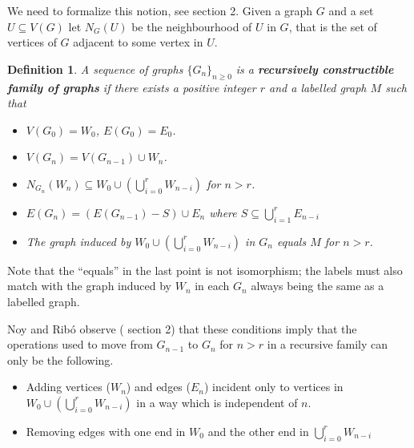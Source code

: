 \documentclass[12pt]{amsart}
\newtheorem{definition}{Definition}
\numberwithin{definition}{section}
\begin{document}
We need to formalize this notion, see \cite{NoyRibo2004} section 2.  Given a graph $G$ and a set $U\subseteq V(G)$ let $N_G(U)$ be the neighbourhood of $U$ in $G$, that is the set of vertices of $G$ adjacent to some vertex in $U$.
\begin{definition}
  A sequence of graphs $\{G_n\}_{n\geq0}$ is a \textbf{recursively constructible family of graphs} if there exists a positive integer $r$ and a labelled graph $M$ such that
  \begin{itemize}
  \item $V(G_0) = W_0$, $E(G_0)=E_0$.
  \item $V(G_n) = V(G_{n-1})\cup W_n$.
  \item $N_{G_n}(W_n)\subseteq W_0 \cup \left(\bigcup_{i=0}^{r}W_{n-i}\right)$ for $n> r$.
  \item $E(G_n) = (E(G_{n-1})- S) \cup E_n$ where $S \subseteq \bigcup_{i=1}^rE_{n-i}$
  \item The graph induced by $W_0\cup\left(\bigcup_{i=0}^{r}W_{n-i}\right)$ in $G_n$ equals $M$ for $n>r$.
  \end{itemize}
\end{definition}
Note that the ``equals'' in the last point is not isomorphism; the labels must also match with the graph induced by $W_n$ in each $G_n$ always being the same as a labelled graph.

Noy and Rib\'{o} observe (\cite{NoyRibo2004} section 2) that these conditions imply that the operations used to move from $G_{n-1}$ to $G_n$ for $n>r$ in a recursive family can only be the following.
\begin{itemize}
\item Adding vertices ($W_n$) and edges ($E_n$) incident only to vertices in $W_0\cup\left(\bigcup_{i=0}^{r}W_{n-i}\right)$ in a way which is independent of $n$.
\item Removing edges with one end in $W_0$ and the other end in $\bigcup_{i=0}^{r}W_{n-i}$
\end{itemize}

%
\end{document}
